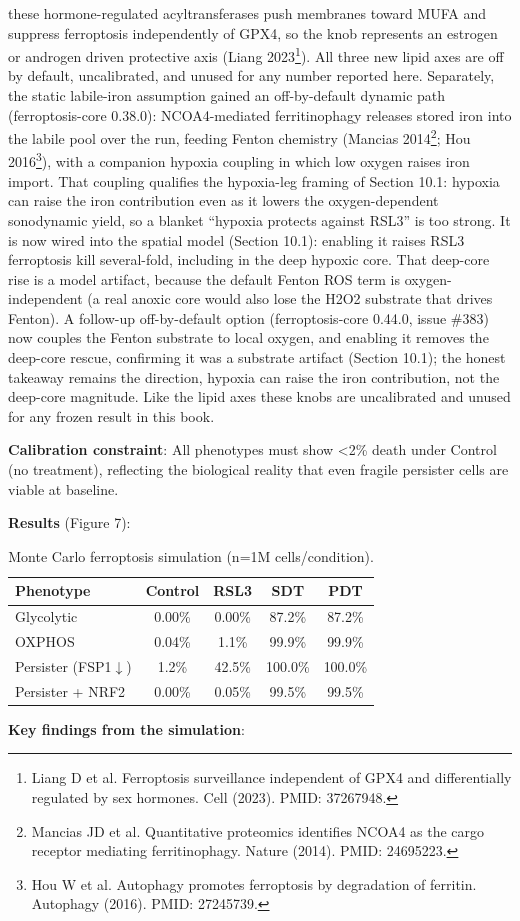 \documentclass[11pt,twoside,openright]{report}
\begin{document}
these hormone-regulated acyltransferases push membranes toward MUFA and suppress ferroptosis independently of GPX4, so the knob represents an estrogen or androgen driven protective axis (Liang 2023\footnote{Liang D et al. Ferroptosis surveillance independent of GPX4 and differentially regulated by sex hormones. Cell (2023). PMID: 37267948.}). All three new lipid axes are off by default, uncalibrated, and unused for any number reported here. Separately, the static labile-iron assumption gained an off-by-default dynamic path (ferroptosis-core 0.38.0): NCOA4-mediated ferritinophagy releases stored iron into the labile pool over the run, feeding Fenton chemistry (Mancias 2014\footnote{Mancias JD et al. Quantitative proteomics identifies NCOA4 as the cargo receptor mediating ferritinophagy. Nature (2014). PMID: 24695223.}; Hou 2016\footnote{Hou W et al. Autophagy promotes ferroptosis by degradation of ferritin. Autophagy (2016). PMID: 27245739.}), with a companion hypoxia coupling in which low oxygen raises iron import. That coupling qualifies the hypoxia-leg framing of Section 10.1: hypoxia can raise the iron contribution even as it lowers the oxygen-dependent sonodynamic yield, so a blanket ``hypoxia protects against RSL3'' is too strong. It is now wired into the spatial model (Section 10.1): enabling it raises RSL3 ferroptosis kill several-fold, including in the deep hypoxic core. That deep-core rise is a model artifact, because the default Fenton ROS term is oxygen-independent (a real anoxic core would also lose the H2O2 substrate that drives Fenton). A follow-up off-by-default option (ferroptosis-core 0.44.0, issue \#383) now couples the Fenton substrate to local oxygen, and enabling it removes the deep-core rescue, confirming it was a substrate artifact (Section 10.1); the honest takeaway remains the direction, hypoxia can raise the iron contribution, not the deep-core magnitude. Like the lipid axes these knobs are uncalibrated and unused for any frozen result in this book.

\textbf{Calibration constraint}: All phenotypes must show <2\% death under Control (no treatment), reflecting the biological reality that even fragile persister cells are viable at baseline.

\textbf{Results} (Figure 7):

\begin{table}[tbp]
\caption{Monte Carlo ferroptosis simulation (n=1M cells/condition).}
\label{tab:sim}
\booktablesize\begin{tabular}{lcccc}
\toprule
\textbf{Phenotype} & \textbf{Control} & \textbf{RSL3} & \textbf{SDT} & \textbf{PDT} \\
\midrule
Glycolytic & 0.00\% & 0.00\% & 87.2\% & 87.2\% \\
OXPHOS & 0.04\% & 1.1\% & 99.9\% & 99.9\% \\
Persister (FSP1$\downarrow$) & 1.2\% & 42.5\% & 100.0\% & 100.0\% \\
Persister + NRF2 & 0.00\% & 0.05\% & 99.5\% & 99.5\% \\
\bottomrule
\end{tabular}
\end{table}
\textbf{Key findings from the simulation}:
\end{document}
